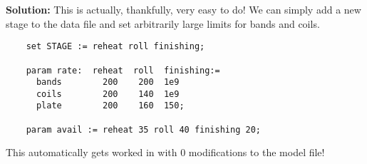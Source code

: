 \noindent\textbf{Solution:} This is actually, thankfully, very easy to do! We can simply add a new stage to the data file and set arbitrarily large limits for bands and coils.

\begin{lstlisting}
	set STAGE := reheat roll finishing;

	param rate:  reheat  roll  finishing:=
	  bands        200    200  1e9
	  coils        200    140  1e9
	  plate        200    160  150;

	param avail := reheat 35 roll 40 finishing 20;
\end{lstlisting}

This automatically gets worked in with 0 modifications to the model file!
